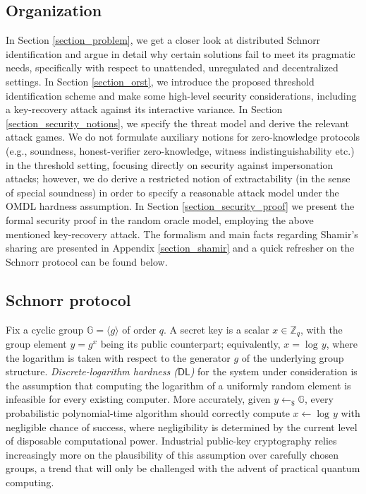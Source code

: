\documentclass[10pt, psamsfonts, reqno]{amsart}
\theoremstyle{definition}
\theoremstyle{remark}
\numberwithin{equation}{section}
\begin{document}
\subsection{Organization}\label{section_organization}
In Section \ref{section_problem}, we get a closer look
at distributed Schnorr identification
and argue in detail why certain solutions
fail to meet its pragmatic needs,
specifically with respect to
unattended, unregulated and decentralized settings.
In Section \ref{section_orst}, we introduce the
proposed threshold identification scheme
and make some high-level security considerations,
including a key-recovery attack against
its interactive variance.
In Section \ref{section_security_notions},
we specify the threat model
and derive the relevant attack games.
We do not formulate auxiliary notions
for zero-knowledge protocols
(e.g., soundness, honest-verifier zero-knowledge,
witness indistinguishability etc.)
in the threshold setting,
focusing directly on security against impersonation attacks;
however, we do derive a restricted notion of extractability
(in the sense of special soundness)
in order to specify a reasonable attack model
under the OMDL hardness assumption.
In Section \ref{section_security_proof} we present
the formal security proof in the random oracle model,
employing the above mentioned key-recovery attack.
The formalism and main facts regarding Shamir's sharing
are presented in Appendix \ref{section_shamir}
and a quick refresher on the
Schnorr protocol can be found below.

\subsection{Schnorr protocol}\label{section_schnorr}

\noindent
Fix a cyclic group $\mathbb{G} = \langle g \rangle$ of order $q$.
A secret key is a scalar $x \in \mathbb{Z}_q$,
with the group element $y = g ^ x$
being its public counterpart;
equivalently, $x = \log\hspace{1pt} y$,
where the logarithm is taken with respect to the
generator $g$ of the underlying group structure.
\textit{Discrete-logarithm hardness \textup{($\mathsf{DL}$)}} for
the system under consideration
is the assumption that computing the logarithm of
a uniformly random element is infeasible
for every existing computer.
More accurately, given $y \leftarrow_\$ \mathbb{G}$,
every probabilistic polynomial-time algorithm
should correctly compute $x \leftarrow \log\hspace{1pt} y$
with negligible chance of success,
where negligibility is determined by
the current level of disposable computational power.
Industrial public-key cryptography relies increasingly more
on the plausibility of this assumption over
carefully chosen groups, a trend that will
only be challenged with the advent of practical quantum computing.
\end{document}
